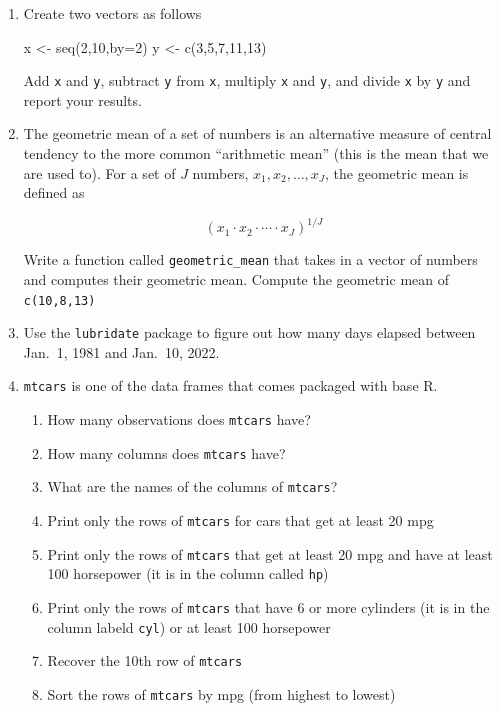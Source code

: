 \documentclass[
  letterpaper,
  DIV=11,
  numbers=noendperiod]{scrreprt}
\newenvironment{Shaded}{\begin{snugshade}}{\end{snugshade}}
\newcommand{\AttributeTok}[1]{\textcolor[rgb]{0.40,0.45,0.13}{#1}}
\newcommand{\DecValTok}[1]{\textcolor[rgb]{0.68,0.00,0.00}{#1}}
\newcommand{\FunctionTok}[1]{\textcolor[rgb]{0.28,0.35,0.67}{#1}}
\newcommand{\NormalTok}[1]{\textcolor[rgb]{0.00,0.23,0.31}{#1}}
\newcommand{\OtherTok}[1]{\textcolor[rgb]{0.00,0.23,0.31}{#1}}
\begin{document}
\begin{enumerate}
\def\labelenumi{\arabic{enumi}.}
\item
  Create two vectors as follows

\begin{Shaded}
\begin{Highlighting}[]
\NormalTok{x }\OtherTok{\textless{}{-}} \FunctionTok{seq}\NormalTok{(}\DecValTok{2}\NormalTok{,}\DecValTok{10}\NormalTok{,}\AttributeTok{by=}\DecValTok{2}\NormalTok{)}
\NormalTok{y }\OtherTok{\textless{}{-}} \FunctionTok{c}\NormalTok{(}\DecValTok{3}\NormalTok{,}\DecValTok{5}\NormalTok{,}\DecValTok{7}\NormalTok{,}\DecValTok{11}\NormalTok{,}\DecValTok{13}\NormalTok{)}
\end{Highlighting}
\end{Shaded}

  Add \texttt{x} and \texttt{y}, subtract \texttt{y} from \texttt{x},
  multiply \texttt{x} and \texttt{y}, and divide \texttt{x} by
  \texttt{y} and report your results.
\item
  The geometric mean of a set of numbers is an alternative measure of
  central tendency to the more common ``arithmetic mean'' (this is the
  mean that we are used to). For a set of \(J\) numbers,
  \(x_1,x_2,\ldots,x_J\), the geometric mean is defined as

  \[
     (x_1 \cdot x_2 \cdot \cdots \cdot x_J)^{1/J}
   \]

  Write a function called \texttt{geometric\_mean} that takes in a
  vector of numbers and computes their geometric mean. Compute the
  geometric mean of \texttt{c(10,8,13)}
\item
  Use the \texttt{lubridate} package to figure out how many days elapsed
  between Jan.~1, 1981 and Jan.~10, 2022.
\item
  \texttt{mtcars} is one of the data frames that comes packaged with
  base R.

  \begin{enumerate}
  \def\labelenumii{\alph{enumii})}
  \item
    How many observations does \texttt{mtcars} have?
  \item
    How many columns does \texttt{mtcars} have?
  \item
    What are the names of the columns of \texttt{mtcars}?
  \item
    Print only the rows of \texttt{mtcars} for cars that get at least 20
    mpg
  \item
    Print only the rows of \texttt{mtcars} that get at least 20 mpg and
    have at least 100 horsepower (it is in the column called
    \texttt{hp})
  \item
    Print only the rows of \texttt{mtcars} that have 6 or more cylinders
    (it is in the column labeld \texttt{cyl}) or at least 100 horsepower
  \item
    Recover the 10th row of \texttt{mtcars}
  \item
    Sort the rows of \texttt{mtcars} by mpg (from highest to lowest)
  \end{enumerate}
\end{enumerate}
\end{document}
